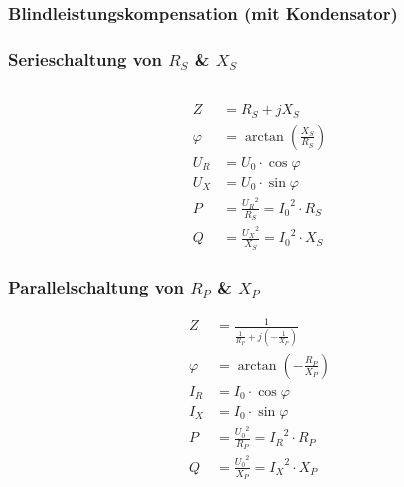 		\subsubsection{Blindleistungskompensation (mit Kondensator)}
		
		\begin{multicols}{2}
			\subsubsection{Serieschaltung von $R_S$ \& $X_S$}
				\begin{tabular}{lll}
				\end{tabular}
				\begin{align*} 
					Z 		&	= R_S + jX_S 				  \\
					\varphi &	= \arctan(\frac{X_S}{R_S}) 	  \\
					U_R 	&	= U_0 \cdot \cos\varphi 	  \\
					U_X		&	= U_0 \cdot \sin\varphi 	  \\
					P		&	= \frac{{U_R}^2}{R_S} = {I_0}^2\cdot R_S  \\
					Q		&	= \frac{{U_X}^2}{X_S} = {I_0}^2\cdot X_S					
				 \end{align*}
			\columnbreak 
			\subsubsection{Parallelschaltung von $R_P$ \& $X_P$}
				\begin{align*}
					Z 		&	= \frac{1}{\frac{1}{R_P}+j(-\frac{1}{X_P})}	\\
					\varphi &	= \arctan(- \frac{R_P}{X_P})				\\
					I_R 	&	= I_0 \cdot \cos\varphi						\\
					I_X		&	= I_0 \cdot \sin\varphi						\\
					P		&	= \frac{{U_0}^2}{R_P} = {I_R}^2\cdot R_P	    \\
					Q		&	= \frac{{U_0}^2}{X_P} = {I_X}^2\cdot X_P
				\end{align*}
		\end{multicols}

